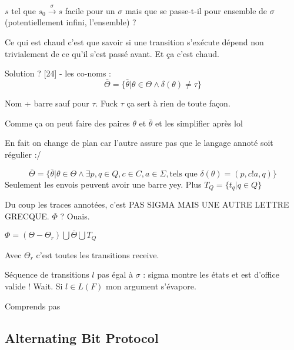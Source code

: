 $s$ tel que $s_0\xrightarrow{\sigma}s$ facile pour un $\sigma$ mais que se passe-t-il pour ensemble de $\sigma$ (potentiellement infini, l'ensemble) ?

Ce qui est chaud c'est que savoir si une transition s'exécute dépend non trivialement de ce qu'il s'est passé avant. Et ça c'est chaud.

Solution ? [24] - les co-noms :
$$
\bar{\Theta}=\{\bar{\theta}|\theta\in\Theta\wedge \delta(\theta)\neq\tau\}
$$

Nom + barre sauf pour $\tau$. Fuck $\tau$ ça sert à rien de toute façon.

Comme ça on peut faire des paires $\theta$ et $\bar{\theta}$ et les simplifier après lol


En fait on change de plan car l'autre assure pas que le langage annoté soit régulier :/

$$
\bar{\Theta}=\{\bar{\theta}|\theta\in\Theta\wedge\exists p,q \in Q, c\in C, a\in\Sigma,\text{tels que } \delta(\theta)=(p,c!a,q)\}
$$
Seulement les envois peuvent avoir une barre yey. Plus $T_Q = \{t_q | q\in Q\}$

Du coup les traces annotées, c'est PAS SIGMA MAIS UNE AUTRE LETTRE GRECQUE. $\Phi$ ? Ouais.


$\Phi=(\Theta-\Theta_r)\bigcup\bar{\Theta}\bigcup T_Q$

Avec $\Theta_r$ c'est toutes les transitions receive.

Séquence de transitions $l$ pas égal à $\sigma$ : sigma montre les états et est d'office valide !
Wait. Si $l\in L(F)$ mon argument s'évapore.





Comprends pas



  \subsection{Alternating Bit Protocol}\label{ss:abp}

